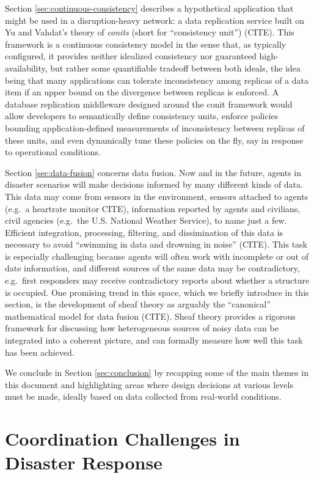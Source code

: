 \documentclass[]             %
{NASA}                       %
\theoremstyle{definition}
\begin{document}
Section \ref{sec:continuous-consistency} describes a hypothetical
application that might be used in a disruption-heavy network: a data
replication service built on Yu and Vahdat's theory of \emph{conits}
(short for ``consistency unit'') (CITE). This framework is a continuous
consistency model in the sense that, as typically configured, it
provides neither idealized consistency nor guaranteed high-availability,
but rather some quantifiable tradeoff between both ideals, the idea
being that many applications can tolerate inconsistency among replicas
of a data item if an upper bound on the divergence between replicas is
enforced. A database replication middleware designed around the conit
framework would allow developers to semantically define consistency
units, enforce policies bounding application-defined measurements of
inconsistency between replicas of these units, and even dynamically tune
these policies on the fly, say in response to operational conditions.

Section \ref{sec:data-fusion} concerns data fusion. Now and in the
future, agents in disaster scenarios will make decisions informed by
many different kinds of data. This data may come from sensors in the
environment, sensors attached to agents (e.g.~a heartrate monitor CITE),
information reported by agents and civilians, civil agencies (e.g.~the
U.S. National Weather Service), to name just a few. Efficient
integration, processing, filtering, and dissimination of this data is
necessary to avoid ``swimming in data and drowning in noise'' (CITE).
This task is especially challenging because agents will often work with
incomplete or out of date information, and different sources of the same
data may be contradictory, e.g.~first responders may receive
contradictory reports about whether a structure is occupied. One
promising trend in this space, which we briefly introduce in this
section, is the development of sheaf theory as arguably the
``canonical'' mathematical model for data fusion (CITE). Sheaf theory
provides a rigorous framework for discussing how heterogeneous sources
of noisy data can be integrated into a coherent picture, and can
formally measure how well this task has been achieved.

We conclude in Section \ref{sec:conclusion} by recapping some of the
main themes in this document and highlighting areas where design
decisions at various levels must be made, ideally based on data
collected from real-world conditions.

\newpage

\hypertarget{coordination-challenges-in-disaster-response}{%
\section{Coordination Challenges in Disaster
Response}\label{coordination-challenges-in-disaster-response}}
\end{document}
